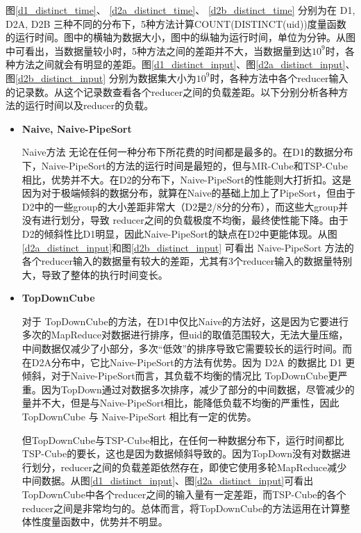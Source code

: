 图\ref{d1_distinct_time}、 \ref{d2a_distinct_time}、 \ref{d2b_distinct_time} 分别为在 D1, D2A, D2B 三种不同的分布下，5种方法计算COUNT(DISTINCT(uid))度量函数的运行时间。图中的横轴为数据大小，图中的纵轴为运行时间，单位为分钟。从图中可看出，当数据量较小时，5种方法之间的差距并不大，当数据量到达${10}^{9}$时，各种方法之间就会有明显的差距。图\ref{d1_distinct_input}、图\ref{d2a_distinct_input}、图\ref{d2b_distinct_input} 分别为数据集大小为${10}^{9}$时，各种方法中各个reducer输入的记录数。从这个记录数查看各个reducer之间的负载差距。以下分别分析各种方法的运行时间以及reducer的负载。

\begin{itemize}

\item \textbf{Naive, Naive-PipeSort}

Naive方法 无论在任何一种分布下所花费的时间都是最多的。在D1的数据分布下，Naive-PipeSort的方法的运行时间是最短的，但与MR-Cube和TSP-Cube相比，优势并不大。在D2的分布下，Naive-PipeSort的性能则大打折扣。这是因为对于极端倾斜的数据分布，就算在Naive的基础上加上了PipeSort，但由于D2中的一些group的大小差距非常大（D2是2/8分的分布），而这些大group并没有进行划分，导致 reducer之间的负载极度不均衡，最终使性能下降。由于D2的倾斜性比D1明显，因此Naive-PipeSort的缺点在D2中更能体现。从图\ref{d2a_distinct_input}和图\ref{d2b_distinct_input} 可看出 Naive-PipeSort 方法的各个reducer输入的数据量有较大的差距，尤其有3个reducer输入的数据量特别大，导致了整体的执行时间变长。

\item \textbf{TopDownCube}

对于 TopDownCube的方法，在D1中仅比Naive的方法好，这是因为它要进行多次的MapReduce对数据进行排序，但uid的取值范围较大，无法大量压缩，中间数据仅减少了小部分，多次``低效”的排序导致它需要较长的运行时间。而在D2A分布中，它比Naive-PipeSort的方法有优势。因为 D2A 的数据比 D1 更倾斜，对于Naive-PipeSort而言，其负载不均衡的情况比 TopDownCube更严重。因为TopDown通过对数据多次排序，减少了部分的中间数据，尽管减少的量并不大，但是与Naive-PipeSort相比，能降低负载不均衡的严重性，因此TopDownCube 与 Naive-PipeSort 相比有一定的优势。

但TopDownCube与TSP-Cube相比，在任何一种数据分布下，运行时间都比TSP-Cube的要长，这也是因为数据倾斜导致的。因为TopDown没有对数据进行划分，reducer之间的负载差距依然存在，即使它使用多轮MapReduce减少中间数据。从图\ref{d1_distinct_input}、图\ref{d2a_distinct_input}可看出TopDownCube中各个reducer之间的输入量有一定差距，而TSP-Cube的各个reducer之间是非常均匀的。总体而言，将TopDownCube的方法运用在计算整体性度量函数中，优势并不明显。


\end{itemize}
